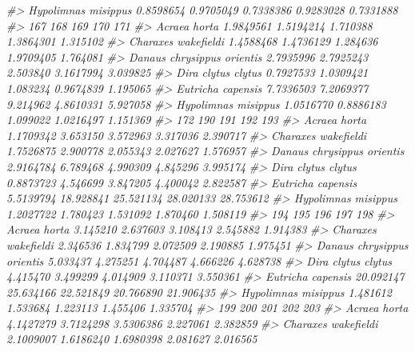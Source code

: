 \documentclass[
]{article}
\newenvironment{Shaded}{\begin{snugshade}}{\end{snugshade}}
\newcommand{\CommentTok}[1]{\textcolor[rgb]{0.56,0.35,0.01}{\textit{#1}}}
\begin{document}
\begin{Shaded}
\begin{Highlighting}[]
\CommentTok{\#\textgreater{} Hypolimnas misippus         0.8598654 0.9705049  0.7338386 0.9283028 0.7331888}
\CommentTok{\#\textgreater{}                                  167       168      169       170      171}
\CommentTok{\#\textgreater{} Acraea horta               1.9849561 1.5194214 1.710388 1.3864301 1.315102}
\CommentTok{\#\textgreater{} Charaxes wakefieldi        1.4588468 1.4736129 1.284636 1.9709405 1.764081}
\CommentTok{\#\textgreater{} Danaus chrysippus orientis 2.7935996 2.7925243 2.503840 3.1617994 3.039825}
\CommentTok{\#\textgreater{} Dira clytus clytus         0.7927533 1.0309421 1.083234 0.9674839 1.195065}
\CommentTok{\#\textgreater{} Eutricha capensis          7.7336503 7.2069377 9.214962 4.8610331 5.927058}
\CommentTok{\#\textgreater{} Hypolimnas misippus        1.0516770 0.8886183 1.099022 1.0216497 1.151369}
\CommentTok{\#\textgreater{}                                  172       190       191       192       193}
\CommentTok{\#\textgreater{} Acraea horta               1.1709342  3.653150  3.572963  3.317036  2.390717}
\CommentTok{\#\textgreater{} Charaxes wakefieldi        1.7526875  2.900778  2.055343  2.027627  1.576957}
\CommentTok{\#\textgreater{} Danaus chrysippus orientis 2.9164784  6.789468  4.990309  4.845296  3.995174}
\CommentTok{\#\textgreater{} Dira clytus clytus         0.8873723  4.546699  3.847205  4.400042  2.822587}
\CommentTok{\#\textgreater{} Eutricha capensis          5.5139794 18.928841 25.521134 28.020133 28.753612}
\CommentTok{\#\textgreater{} Hypolimnas misippus        1.2027722  1.780423  1.531092  1.870460  1.508119}
\CommentTok{\#\textgreater{}                                  194       195       196       197       198}
\CommentTok{\#\textgreater{} Acraea horta                3.145210  2.637603  3.108413  2.545882  1.914383}
\CommentTok{\#\textgreater{} Charaxes wakefieldi         2.346536  1.834799  2.072509  2.190885  1.975451}
\CommentTok{\#\textgreater{} Danaus chrysippus orientis  5.033437  4.275251  4.704487  4.666226  4.628738}
\CommentTok{\#\textgreater{} Dira clytus clytus          4.415470  3.499299  4.014909  3.110371  3.550361}
\CommentTok{\#\textgreater{} Eutricha capensis          20.092147 25.634166 22.521849 20.766890 21.906435}
\CommentTok{\#\textgreater{} Hypolimnas misippus         1.481612  1.533684  1.223113  1.455406  1.335704}
\CommentTok{\#\textgreater{}                                  199        200       201      202      203}
\CommentTok{\#\textgreater{} Acraea horta               4.1427279  3.7124298 3.5306386 2.227061 2.382859}
\CommentTok{\#\textgreater{} Charaxes wakefieldi        2.1009007  1.6186240 1.6980398 2.081627 2.016565}

\end{Highlighting}
\end{Shaded}
\end{document}
